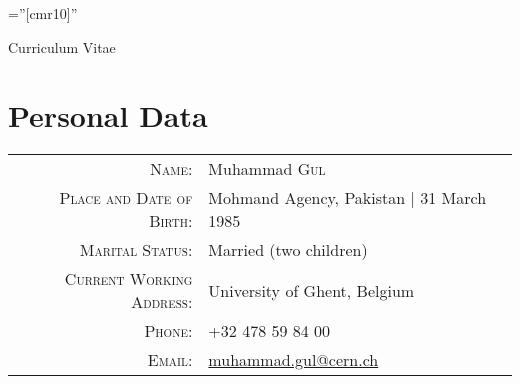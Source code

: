 \documentclass[a4paper,10pt]{article}
\begin{document}

\pagestyle{empty} %

\font\fb=''[cmr10]'' %

\par{\centering
		{\Huge Curriculum Vitae
	}\bigskip\par}

\section{Personal Data}

\begin{tabular}{rl}
    \textsc{Name:} & Muhammad \textsc{Gul} \\
    \textsc{Place and Date of Birth:} & Mohmand Agency, Pakistan  | 31 March 1985 \\
    \textsc{Marital Status:} & Married (two children)\\
    \textsc{Current Working Address:}   & University of Ghent, Belgium \\
    \textsc{Phone:}     & +32 478 59 84 00\\
    \textsc{Email:}     & \href{mailto:muhammad.gul@cern.ch}{muhammad.gul@cern.ch}
\end{tabular}

\end{document}
